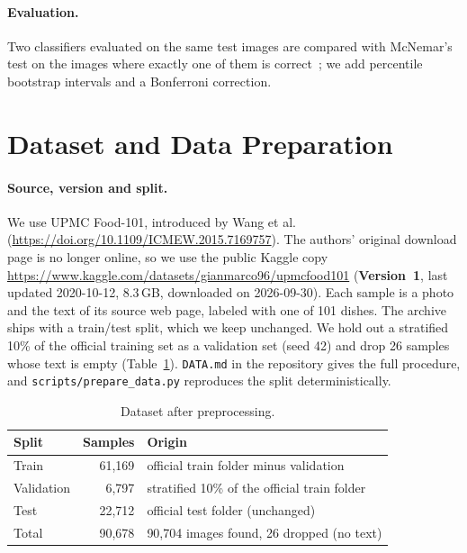 \documentclass[11pt,a4paper]{article}
\begin{document}
\paragraph{Evaluation.}
Two classifiers evaluated on the same test images are compared with McNemar's test on the images where exactly one
of them is correct~\cite{mcnemar1947}; we add percentile bootstrap intervals and a Bonferroni correction.

\section{Dataset and Data Preparation}
\label{sec:data}

\paragraph{Source, version and split.}
We use UPMC Food-101, introduced by Wang et al.~\cite{wang2015recipe}
(\url{https://doi.org/10.1109/ICMEW.2015.7169757}). The authors' original download page is no longer online, so we
use the public Kaggle copy \url{https://www.kaggle.com/datasets/gianmarco96/upmcfood101} (\textbf{Version~1},
last updated 2020-10-12, 8.3\,GB, downloaded on 2026-09-30). Each sample is a photo and the text of its source
web page, labeled with one of 101 dishes. The archive ships with a train/test split, which we keep unchanged. We
hold out a stratified 10\% of the official training set as a validation set (seed 42) and drop 26 samples whose
text is empty (Table~\ref{tab:data}). \texttt{DATA.md} in the repository gives the full procedure, and
\texttt{scripts/prepare\_data.py} reproduces the split deterministically.

\begin{table}[!htbp]
\centering
\caption{Dataset after preprocessing.}
\label{tab:data}
\begin{tabular}{lrl}
\toprule
Split & Samples & Origin \\
\midrule
Train & 61,169 & official train folder minus validation \\
Validation & 6,797 & stratified 10\% of the official train folder \\
Test & 22,712 & official test folder (unchanged) \\
\midrule
Total & 90,678 & 90,704 images found, 26 dropped (no text) \\
\bottomrule
\end{tabular}
\end{table}
\end{document}
